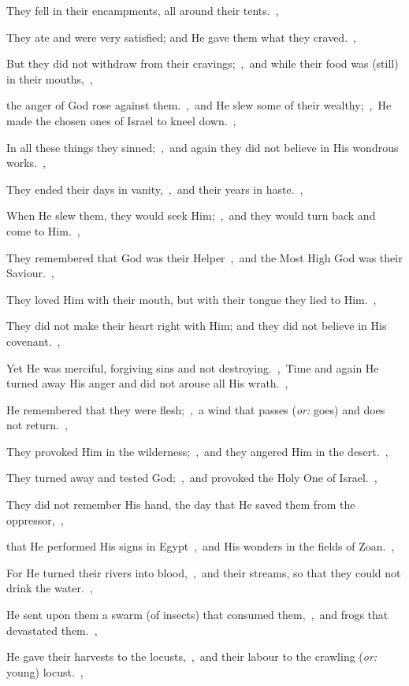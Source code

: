 \documentclass[12pt,twoside,a5paper]{article}
\newcommand{\translationoption}[1]{\emph{or:} #1}
\begin{document}
\begin{normalparskip}
  They fell in their encampments, all around their tents.~\sep

  They ate and were very satisfied; and He gave them what they craved.~\sep

  But they did not withdraw from their cravings;~\sep\ and while their food was (still) in their mouths,~\sep

  the anger of God rose against them.~\sep\ and He slew some of their wealthy;~\sep\ He made the chosen ones of Israel to kneel down.~\sep

  In all these things they sinned;~\sep\ and again they did not believe in His wondrous works.~\sep

  They ended their days in vanity,~\sep\ and their years in haste.~\sep

  When He slew them, they would seek Him;~\sep\ and they would turn back and come to Him.~\sep

  They remembered that God was their Helper~\sep\ and the Most High God was their Saviour.~\sep

  They loved Him with their mouth, but with their tongue they lied to Him.~\sep

  They did not make their heart right with Him; and they did not believe in His covenant.~\sep

  Yet He was merciful, forgiving sins and not destroying.~\sep\ Time and again He turned away His anger and did not arouse all His wrath.~\sep

  He remembered that they were flesh;~\sep\ a wind that passes (\translationoption{goes}) and does not return.~\sep

  They provoked Him in the wilderness;~\sep\ and they angered Him in the desert.~\sep

  They turned away and tested God;~\sep\ and provoked the Holy One of Israel.~\sep

  They did not remember His hand, the day that He saved them from the oppressor,~\sep

  that He performed His signs in Egypt~\sep\ and His wonders in the fields of Zoan.~\sep

  For He turned their rivers into blood,~\sep\ and their streams, so that they could not drink the water.~\sep

  He sent upon them a swarm (of insects) that consumed them,~\sep\ and frogs that devastated them.~\sep

  He gave their harvests to the locusts,~\sep\ and their labour to the crawling (\translationoption{young}) locust.~\sep


\end{normalparskip}
\end{document}
